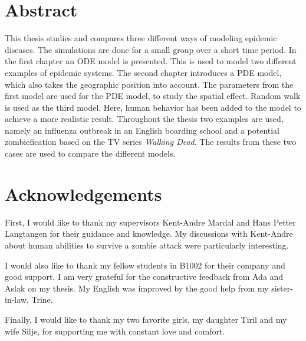 \documentclass[%
twoside,                 %
final,                   %
chapterprefix=true,      %
open=right               %
10pt]{book}
\begin{document}



\newcommand{\Imax}{I_{\textrm{max}}}

\chapter*{Abstract}
This thesis studies and compares three different ways of modeling epidemic diseases. The simulations are done for a small group over a short time period. In the first chapter an ODE model is presented. This is used to model two different examples of epidemic systems. The second chapter introduces a PDE model, which also takes the geographic position into account. The parameters from the first model are used for the PDE model, to study the spatial effect. Random walk is used as the third model. Here, human behavior has been added to the model to achieve a more realistic result. Throughout the thesis two examples are used, namely an influenza outbreak in an English boarding school and a potential zombiefication based on the TV series \emph{Walking Dead}. The results from these two cases are used to compare the different models. 

\chapter*{Acknowledgements}
First, I would like to thank my supervisors Kent-Andre Mardal and Hans Petter Langtangen for their guidance and knowledge. My discussions with Kent-Andre about human abilities to survive a zombie attack were particularly interesting. 


\vspace{3mm}


I would also like to thank my fellow students in B1002 for their company and good support. I am very grateful for the constructive feedback from Ada and Aslak on my thesis. My English was improved by the good help from my sister-in-law, Trine.


\vspace{3mm}


Finally, I would like to thank my two favorite girls, my daughter Tiril and my wife Silje, for supporting me with constant love and comfort.     



\tableofcontents


\vspace{1cm} %
\end{document}
